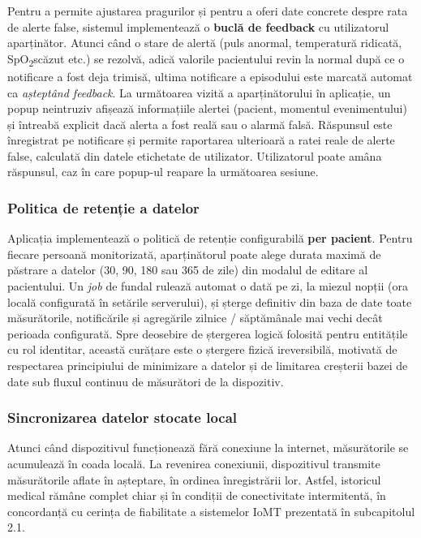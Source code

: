 ﻿\documentclass[12pt,a4paper,twoside]{article}
\newcommand{\spo}{SpO\textsubscript{2}}
\begin{document}
Pentru a permite ajustarea pragurilor și pentru a oferi date concrete despre rata de alerte false, sistemul implementează o \textbf{buclă de feedback} cu utilizatorul aparținător. Atunci când o stare de alertă (puls anormal, temperatură ridicată, \spo scăzut etc.) se rezolvă, adică valorile pacientului revin la normal după ce o notificare a fost deja trimisă, ultima notificare a episodului este marcată automat ca \textit{așteptând feedback}. La următoarea vizită a aparținătorului în aplicație, un popup neintruziv afișează informațiile alertei (pacient, momentul evenimentului) și întreabă explicit dacă alerta a fost reală sau o alarmă falsă. Răspunsul este înregistrat pe notificare și permite raportarea ulterioară a ratei reale de alerte false, calculată din datele etichetate de utilizator. Utilizatorul poate amâna răspunsul, caz în care popup-ul reapare la următoarea sesiune.

\subsubsection{Politica de retenție a datelor}

Aplicația implementează o politică de retenție configurabilă \textbf{per pacient}. Pentru fiecare persoană monitorizată, aparținătorul poate alege durata maximă de păstrare a datelor (30, 90, 180 sau 365 de zile) din modalul de editare al pacientului. Un \textit{job} de fundal rulează automat o dată pe zi, la miezul nopții (ora locală configurată în setările serverului), și șterge definitiv din baza de date toate măsurătorile, notificările și agregările zilnice / săptămânale mai vechi decât perioada configurată. Spre deosebire de ștergerea logică folosită pentru entitățile cu rol identitar, această curățare este o ștergere fizică ireversibilă, motivată de respectarea principiului de minimizare a datelor și de limitarea creșterii bazei de date sub fluxul continuu de măsurători de la dispozitiv.

\subsubsection{Sincronizarea datelor stocate local}

Atunci când dispozitivul funcționează fără conexiune la internet, măsurătorile se acumulează în coada locală. La revenirea conexiunii, dispozitivul transmite măsurătorile aflate în așteptare, în ordinea înregistrării lor. Astfel, istoricul medical rămâne complet chiar și în condiții de conectivitate intermitentă, în concordanță cu cerința de fiabilitate a sistemelor IoMT prezentată în subcapitolul 2.1.
\end{document}
